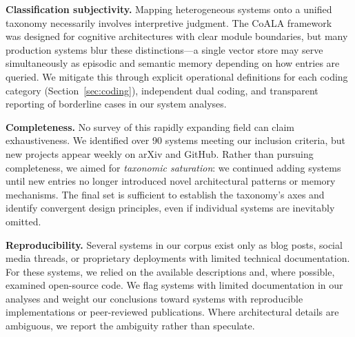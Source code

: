 \textbf{Classification subjectivity.} Mapping heterogeneous systems onto
a unified taxonomy necessarily involves interpretive judgment. The CoALA
framework~\cite{sumers2024coala} was designed for cognitive architectures
with clear module boundaries, but many production systems blur these
distinctions---a single vector store may serve simultaneously as episodic
and semantic memory depending on how entries are queried. We mitigate this
through explicit operational definitions for each coding category
(Section~\ref{sec:coding}), independent dual coding, and transparent
reporting of borderline cases in our system analyses.

\textbf{Completeness.} No survey of this rapidly expanding field can
claim exhaustiveness. We identified over 90 systems meeting our inclusion
criteria, but new projects appear weekly on arXiv and GitHub. Rather than
pursuing completeness, we aimed for \emph{taxonomic saturation}: we
continued adding systems until new entries no longer introduced novel
architectural patterns or memory mechanisms. The final set is sufficient
to establish the taxonomy's axes and identify convergent design principles,
even if individual systems are inevitably omitted.

\textbf{Reproducibility.} Several systems in our corpus exist only as
blog posts, social media threads, or proprietary deployments with limited
technical documentation. For these systems, we relied on the available
descriptions and, where possible, examined open-source code. We flag
systems with limited documentation in our analyses and weight our
conclusions toward systems with reproducible implementations or
peer-reviewed publications. Where architectural details are ambiguous, we
report the ambiguity rather than speculate.
